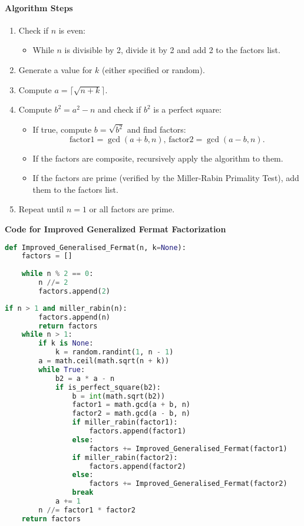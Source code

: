 \documentclass[12pt]{report}
\begin{document}
\paragraph{Algorithm Steps}

\begin{enumerate}
    \item Check if $n$ is even:
    \begin{itemize}
        \item While $n$ is divisible by 2, divide it by 2 and add 2 to the factors list.
    \end{itemize}
    \item Generate a value for $k$ (either specified or random).
    \item Compute $a = \lceil \sqrt{n + k} \rceil$.
    \item Compute $b^2 = a^2 - n$ and check if $b^2$ is a perfect square:
    \begin{itemize}
        \item If true, compute $b = \sqrt{b^2}$ and find factors:
\[
        \text{factor1} = \gcd(a + b, n), \, \text{factor2} = \gcd(a - b, n).
\]
        \item If the factors are composite, recursively apply the algorithm to them.
        \item If the factors are prime (verified by the Miller-Rabin Primality Test), add them to the factors list.
    \end{itemize}
    \item Repeat until $n = 1$ or all factors are prime.
\end{enumerate}

\begin{center}
    \item \textbf{Code for Improved Generalized Fermat Factorization}
\end{center}

\begin{lstlisting}[language=Python]
def Improved_Generalised_Fermat(n, k=None):
    factors = []
    
    while n % 2 == 0:
        n //= 2
        factors.append(2)
\end{lstlisting}

\clearpage

\begin{lstlisting}[language=Python]
    if n > 1 and miller_rabin(n):
        factors.append(n)
        return factors
    while n > 1:
        if k is None:
            k = random.randint(1, n - 1)
        a = math.ceil(math.sqrt(n + k))
        while True:
            b2 = a * a - n
            if is_perfect_square(b2):
                b = int(math.sqrt(b2))
                factor1 = math.gcd(a + b, n)
                factor2 = math.gcd(a - b, n)
                if miller_rabin(factor1):
                    factors.append(factor1)
                else:
                    factors += Improved_Generalised_Fermat(factor1)
                if miller_rabin(factor2):
                    factors.append(factor2)
                else:
                    factors += Improved_Generalised_Fermat(factor2)
                break
            a += 1
        n //= factor1 * factor2
    return factors
\end{lstlisting}
\end{document}
